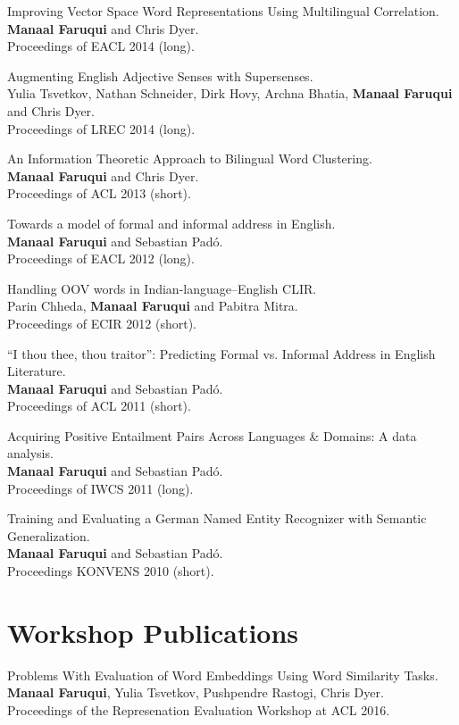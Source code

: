 \documentclass[margin,line]{res}
\begin{document}
\begin{resume}
Improving Vector Space Word Representations Using Multilingual Correlation.\\
\textbf{Manaal Faruqui} and Chris Dyer.\\
Proceedings of EACL 2014 (long).

Augmenting English Adjective Senses with Supersenses.\\
Yulia Tsvetkov, Nathan Schneider, Dirk Hovy, Archna Bhatia, \textbf{Manaal Faruqui} and Chris Dyer.\\
Proceedings of LREC 2014 (long).

An Information Theoretic Approach to Bilingual Word Clustering.\\
\textbf{Manaal Faruqui} and Chris Dyer.\\
Proceedings of ACL 2013 (short).

Towards a model of formal and informal address in English.\\
\textbf{Manaal Faruqui} and Sebastian Pad\'{o}.\\
Proceedings of EACL 2012 (long).

Handling OOV words in Indian-language--English CLIR.\\
Parin Chheda, \textbf{Manaal Faruqui} and Pabitra Mitra.\\
Proceedings of ECIR 2012 (short).

``I thou thee, thou traitor'': Predicting Formal vs. Informal Address in English Literature.\\
\textbf{Manaal Faruqui} and Sebastian Pad\'{o}.\\
Proceedings of ACL 2011 (short).

Acquiring Positive Entailment Pairs Across Languages \& Domains: A data analysis.\\
\textbf{Manaal Faruqui} and Sebastian Pad\'{o}.\\
Proceedings of IWCS 2011 (long).

Training and Evaluating a German Named Entity Recognizer with Semantic Generalization.\\
\textbf{Manaal Faruqui} and Sebastian Pad\'{o}.\\
Proceedings KONVENS 2010 (short).

\section{\sc Workshop Publications}

Problems With Evaluation of Word Embeddings Using Word Similarity Tasks.\\
\textbf{Manaal Faruqui}, Yulia Tsvetkov, Pushpendre Rastogi, Chris Dyer.\\
Proceedings of the Represenation Evaluation Workshop at ACL 2016.


\end{resume}
\end{document}
